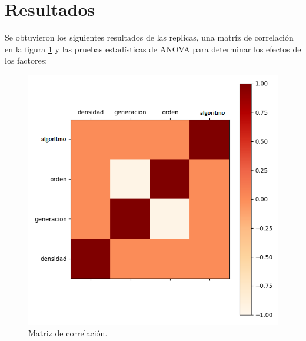 \documentclass{article}
\begin{document}
\section{Resultados}
Se obtuvieron los siguientes resultados de las replicas, una matríz de correlación en la figura \ref{fig:matriz} y las pruebas estadísticas de ANOVA para determinar los efectos de los factores:

\begin{figure}[H]
    \includegraphics[width=\textwidth]{matriz}
    \caption{Matriz de correlación.}
    \label{fig:matriz}
\end{figure}
\end{document}
